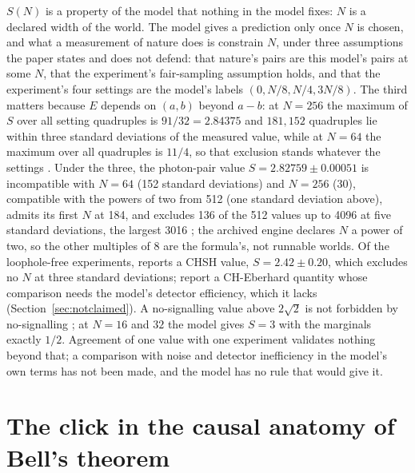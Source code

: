 \documentclass[11pt]{article}
\theoremstyle{definition}
\begin{document}
$S(N)$ is a property of the model that nothing in the model fixes: $N$ is
a declared width of the world. The model gives a prediction only once $N$
is chosen, and what a measurement of nature does is constrain $N$, under
three assumptions the paper states and does not defend: that nature's
pairs are this model's pairs at some $N$, that the experiment's
fair-sampling assumption holds, and that the experiment's four settings
are the model's labels $(0, N/8, N/4, 3N/8)$. The third matters because
$E$ depends on $(a, b)$ beyond $a - b$: at $N = 256$ the maximum of $S$
over all setting quadruples is $91/32 = 2.84375$ and $181{,}152$
quadruples lie within three standard deviations of the measured value,
while at $N = 64$ the maximum over all quadruples is $11/4$, so that
exclusion stands whatever the settings \cite{checks}. Under the three,
the photon-pair value $S = 2.82759 \pm 0.00051$ \cite{poh2015} is
incompatible with $N = 64$ (152 standard deviations) and $N = 256$ (30),
compatible with the powers of two from 512 (one standard deviation
above), admits its first $N$ at 184, and excludes 136 of the 512 values
up to 4096 at five standard deviations, the largest 3016 \cite{checks};
the archived engine declares $N$ a power of two, so the other multiples
of $8$ are the formula's, not runnable worlds. Of the loophole-free
experiments, \cite{hensen2015} reports a CHSH value, $S = 2.42 \pm
0.20$, which excludes no $N$ at three standard deviations;
\cite{giustina2015,shalm2015} report a CH-Eberhard quantity whose
comparison needs the model's detector efficiency, which it lacks
(Section~\ref{sec:notclaimed}). A
no-signalling value above $2\sqrt2$ is not forbidden by no-signalling
\cite{pr1994}; at $N = 16$ and $32$ the model gives $S = 3$ with the
marginals exactly $1/2$. Agreement of one value with one experiment
validates nothing beyond that; a comparison with noise and detector
inefficiency in the model's own terms has not been made, and the model
has no rule that would give it.

\section{The click in the causal anatomy of Bell's theorem}\label{sec:causal}
\end{document}
